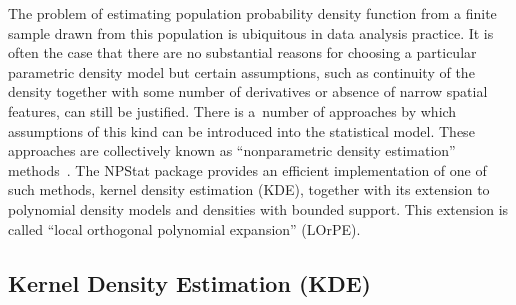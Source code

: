 \documentclass[12pt,titlepage]{article}
\begin{document}
The problem of estimating population probability density function
from a finite sample drawn from this population is ubiquitous
in data analysis practice. It is often the case that
there are no substantial reasons for choosing a particular parametric
density model but certain assumptions,
such as continuity
of the density together with some number of derivatives or absence
of narrow spatial features, can still be justified. There is
a~number of approaches by which assumptions of this kind can be introduced
into the statistical model. These approaches are collectively known
as ``nonparametric
density estimation'' methods~{\cite{ref:silverman, ref:izenmann, ref:kde}}. The NPStat
package provides an efficient implementation of one of 
such methods, kernel density estimation (KDE), together with its extension
to polynomial density models and densities with bounded support. 
This extension is called ``local orthogonal polynomial expansion'' (LOrPE).

\subsection{Kernel Density Estimation (KDE)}
\label{sec:kde}
\end{document}
